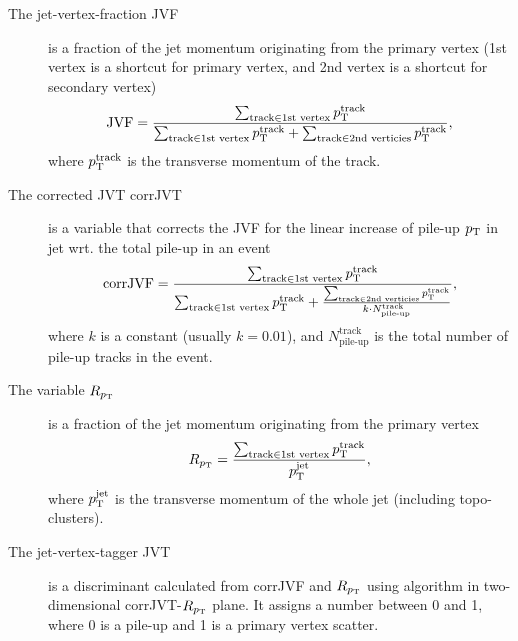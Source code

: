 \begin{description}
     
    \item[The jet-vertex-fraction JVF] is a fraction of the jet momentum originating from the primary vertex (1st vertex is a shortcut for primary vertex, and 2nd vertex is a shortcut for secondary vertex)
    \begin{equation}
        \label{eq:jvf}
    \text{JVF} = \frac{\sum_{\text{track} \in \text{1st vertex}} p_\text{T}^{\text{track}}}{\sum_{\text{track} \in \text{1st vertex}} p_\text{T}^{\text{track}} + \sum_{\text{track} \in \text{2nd verticies}} p_\text{T}^{\text{track}}},
    \end{equation}
    where $p_\text{T}^{\text{track}}$ is the transverse momentum of the track. 
    
    \item[The corrected JVT corrJVT] is a variable that corrects the JVF for the linear increase of pile-up $p_\text{T}$ in jet wrt. the total pile-up in an event
    \begin{equation}
        \label{eq:corr_jvf}
        \text{corrJVF} = \frac{\sum_{\text{track} \in \text{1st vertex}} p_\text{T}^{\text{track}}}{\sum_{\text{track} \in \text{1st vertex}} p_\text{T}^{\text{track}} + \frac{\sum_{\text{track} \in \text{2nd verticies}} p_\text{T}^{\text{track}}}{k\cdot N^{\text{track}}_{\text{pile-up}}}},
    \end{equation}
    where $k$ is a constant (usually $k=0.01$), and $N^{\text{track}}_{\text{pile-up}}$ is the total number of pile-up tracks in the event.
    
    
    \item[The variable $R_{p_\text{T}}$] is a fraction of the jet momentum originating from the primary vertex
    \begin{equation}
        \label{eq:rpt}
        R_{p_\text{T}} = \frac{\sum_{\text{track} \in \text{1st vertex}} p_\text{T}^{\text{track}}}{p_\text{T}^{\text{jet}}},
    \end{equation}
    where $p_\text{T}^{\text{jet}}$ is the transverse momentum of the whole jet (including topo-clusters).

    \item[The jet-vertex-tagger JVT] is a discriminant calculated from corrJVF and $R_{p_\text{T}}$ using \kNN algorithm in two-dimensional corrJVT-$R_{p_\text{T}}$ plane. 
    It assigns a number between 0 and 1, where 0 is a pile-up and 1 is a primary vertex scatter.


\end{description}
